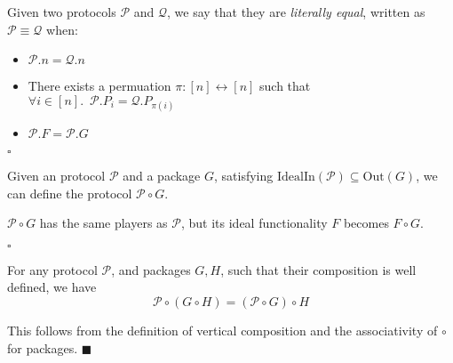 \begin{definition}
Given two protocols $\mathcal{P}$ and $\mathcal{Q}$, we say that
they are \emph{literally equal}, written as $\mathcal{P} \equiv \mathcal{Q}$
when:
\begin{itemize}
\item $\mathcal{P}.n = \mathcal{Q}.n$
\item There exists a permuation $\pi : [n] \leftrightarrow [n]$ such that
$
{\forall i \in [n].\enspace \mathcal{P}.P_i = \mathcal{Q}.P_{\pi(i)}}
$
\item $\mathcal{P}.F = \mathcal{P}.G$
\end{itemize}

$\square$
\end{definition}

\begin{definition}
Given an protocol $\mathcal{P}$ and a package $G$, satisfying
$\text{IdealIn}(\mathcal{P}) \subseteq \text{Out}(G)$,
we can define the protocol $\mathcal{P} \circ G$.

$\mathcal{P} \circ G$ has the same players as $\mathcal{P}$,
but its ideal functionality $F$ becomes $F \circ G$.

$\square$
\end{definition}

\begin{claim}
For any protocol $\mathcal{P}$, and packages $G, H$, such that their composition
is well defined, we have
$$
\mathcal{P} \circ (G \circ H) = (\mathcal{P} \circ G) \circ H
$$

 This follows from the definition of vertical composition
and the associativity of $\circ$ for packages.
$\blacksquare$
\end{claim}

